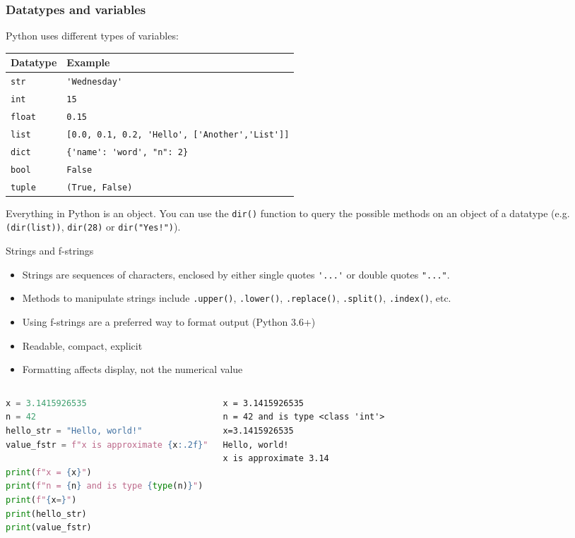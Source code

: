 \begin{frame}[fragile]
  \frametitle{Datatypes and variables}
  Python uses different types of variables:
      \begin{longtable}{l!{\vrule}l}
       Datatype        & Example \\ \hline
       \lstinline$str$    & \lstinline$'Wednesday'$ \\
       \lstinline$int$    & \lstinline$15$ \\
       \lstinline$float$  & \lstinline$0.15$ \\
       \lstinline$list$   & \lstinline$[0.0, 0.1, 0.2, 'Hello', ['Another','List']]$ \\
       \lstinline$dict$   & \lstinline${'name': 'word', "n": 2}$ \\
       \lstinline$bool$   & \lstinline$False$ \\
       \lstinline$tuple$  & \lstinline$(True, False)$ \\
     \end{longtable}
     \pause
     Everything in Python is an object. You can use the \lstinline$dir()$ function to query the possible methods on an object of a datatype (e.g. \lstinline$(dir(list))$, \lstinline$dir(28)$ or \lstinline$dir("Yes!")$).
 \end{frame}

\begin{frame}[fragile]{Strings and f-strings}
  \begin{itemize}
    \item Strings are sequences of characters, enclosed by either single quotes \lstinline$'...'$ or double quotes \lstinline$"..."$.
    \item Methods to manipulate strings include \lstinline$.upper()$, \lstinline$.lower()$, \lstinline$.replace()$, \lstinline$.split()$, \lstinline$.index()$, etc.
    \item Using f-strings are a preferred way to format output (Python 3.6+)
    \item Readable, compact, explicit
    \item Formatting affects display, not the numerical value
  \end{itemize}
  \begin{columns}[T]
    \begin{lstlisting}[language=Python]
x = 3.1415926535
n = 42
hello_str = "Hello, world!"
value_fstr = f"x is approximate {x:.2f}"

print(f"x = {x}")
print(f"n = {n} and is type {type(n)}")
print(f"{x=}")
print(hello_str)
print(value_fstr)
    \end{lstlisting}

    \begin{lstlisting}[style=PyOutput]
x = 3.1415926535
n = 42 and is type <class 'int'>
x=3.1415926535
Hello, world!
x is approximate 3.14
    \end{lstlisting}
  \end{columns}
\end{frame}

